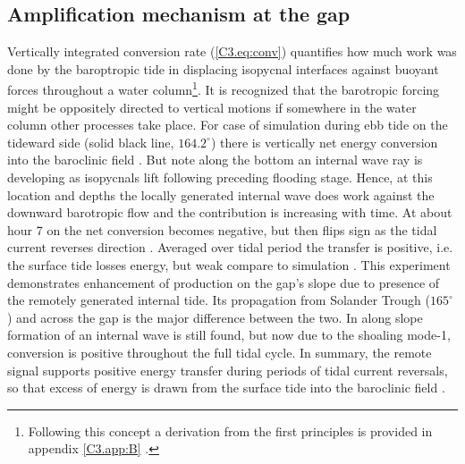 \documentclass[12pt]{article}
\begin{document}
\subsection{Amplification mechanism at the gap}
Vertically integrated conversion rate (\ref{C3.eq:conv}) quantifies how much work was done by the 
baroptropic tide in displacing isopycnal interfaces against buoyant forces throughout a water 
column\footnote{Following this concept a derivation from the first principles is provided in 
appendix \ref{C3.app:B} \citep[see also]{kurapov2003m, kelly2010topo}.}. It is recognized 
that the barotropic forcing might be oppositely directed to vertical motions if somewhere in the 
water column other processes take place. For case of  simulation 
 during ebb tide on the tideward side (solid black line, 
$164.2^{\circ}$) there is vertically net energy conversion into the baroclinic field 
. But note along the bottom an internal wave ray is developing as 
isopycnals lift following preceding flooding stage. Hence, at this location and depths the locally 
generated internal wave does work against the downward barotropic flow and the contribution is 
increasing with time. At about hour 7 on  the net conversion becomes 
negative, but then flips sign as the tidal current reverses direction . 
Averaged over tidal period the transfer is positive, i.e. the surface tide losses energy, but weak 
compare to  simulation . This experiment demonstrates 
enhancement of production on the gap's slope due to presence of the remotely generated internal 
tide. Its propagation from Solander Trough ($165^{\circ}$) and across the gap is the major 
difference between the two. In  along slope formation of an internal wave is still 
found, but now due to the shoaling mode-1, conversion is positive throughout the full tidal cycle. 
In summary, the remote signal supports positive energy transfer during periods of tidal current 
reversals, so that excess of energy is drawn from the surface tide into the baroclinic field 
.\\
\end{document}
